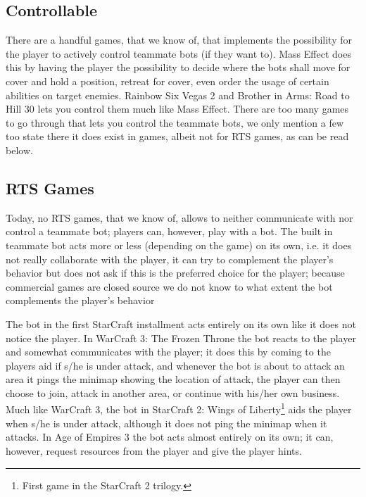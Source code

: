 \subsection{Controllable}
There are a handful games, that we know of, that implements the possibility for the player to actively control teammate bots (if they want to). Mass Effect\cite{masseffect} does this by having the player the possibility to decide where the bots shall move for cover and hold a position, retreat for cover, even order the usage of certain abilities on target enemies. Rainbow Six Vegas 2\cite{rainbow6} and Brother in Arms: Road to Hill 30\cite{brotherinarms} lets you control them much like Mass Effect. There are too many games to go through that lets you control the teammate bots, we only mention a few too state there it does exist in games, albeit not for RTS games, as can be read below.


\subsection{RTS Games}
Today, no RTS games, that we know of, allows to neither communicate with nor control a teammate bot; players can, however, play with a bot. The built in teammate bot acts more or less (depending on the game) on its own, i.e. it does not really collaborate with the player, it can try to complement the player's behavior but does not ask if this is the preferred choice for the player; because commercial games are closed source we do not know to what extent the bot complements the player's behavior

The bot in the first StarCraft\cite{scbw} installment acts entirely on its own like it does not notice the player. In WarCraft 3: The Frozen Throne\cite{wc3ft} the bot reacts to the player and somewhat communicates with the player; it does this by coming to the players aid if s/he is under attack, and whenever the bot is about to attack an area it pings the minimap showing the location of attack, the player can then choose to join, attack in another area, or continue with his/her own business. Much like WarCraft 3, the bot in StarCraft 2: Wings of Liberty\footnote{First game in the StarCraft 2 trilogy.}\cite{sc2wol} aids the player when s/he is under attack, although it does not ping the minimap when it attacks. In Age of Empires 3\cite{ageofempires3} the bot acts almost entirely on its own; it can, however, request resources from the player and give the player hints.